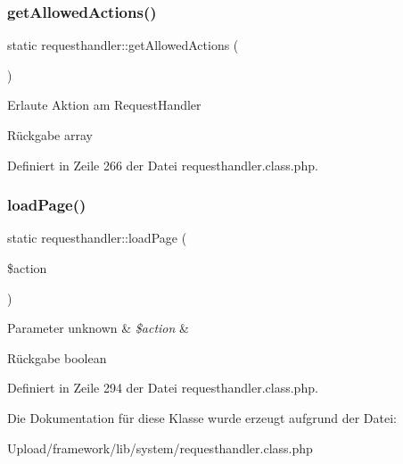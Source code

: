 \subsubsection{\texorpdfstring{get\+Allowed\+Actions()}{getAllowedActions()}}
{\footnotesize\ttfamily static requesthandler\+::get\+Allowed\+Actions (\begin{DoxyParamCaption}{ }\end{DoxyParamCaption})\hspace{0.3cm}{\ttfamily [static]}}

Erlaute Aktion am Request\+Handler \begin{DoxyReturn}{Rückgabe}
array 
\end{DoxyReturn}


Definiert in Zeile 266 der Datei requesthandler.\+class.\+php.

\mbox{\label{classrequesthandler_ab52a1d35d421a292eff1e78c33bfc225}} 
\subsubsection{\texorpdfstring{load\+Page()}{loadPage()}}
{\footnotesize\ttfamily static requesthandler\+::load\+Page (\begin{DoxyParamCaption}\item[{}]{\$action }\end{DoxyParamCaption})\hspace{0.3cm}{\ttfamily [static]}}


\begin{DoxyParams}[1]{Parameter}
unknown & {\em \$action} & \\
\hline
\end{DoxyParams}
\begin{DoxyReturn}{Rückgabe}
boolean 
\end{DoxyReturn}


Definiert in Zeile 294 der Datei requesthandler.\+class.\+php.



Die Dokumentation für diese Klasse wurde erzeugt aufgrund der Datei\+:\begin{DoxyCompactItemize}
\item 
Upload/framework/lib/system/requesthandler.\+class.\+php\end{DoxyCompactItemize}
